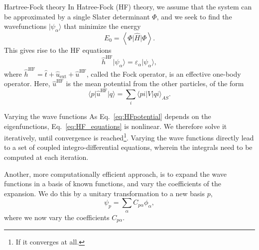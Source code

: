 \documentclass[UKenglish,aspectratio=169]{beamer}
\begin{document}
\begin{frame}{Hartree-Fock theory}
    In Hatree-Fock (HF) theory, we assume that the system can be
    approximated by a single Slater determinant $\Phi$, and we seek
    to find the wavefunctions $\lvert \psi_\alpha \rangle$ that
    minimize the energy
    \begin{equation}
        E_0 = \left\langle \Phi \vert \hat{H} \vert \Phi \right\rangle.
    \end{equation}
    This gives rise to the HF equations
    \begin{equation}\label{eq:HF_equations}
        \hat{h}^\mathrm{HF} \lvert \psi_\alpha \rangle =
        \varepsilon_\alpha \lvert \psi_\alpha \rangle,
    \end{equation}
    where $\hat{h}^\mathrm{HF} = \hat{t} + \hat{u}_{\mathrm{ext}} +
    \hat{u}^\mathrm{HF}$, called the Fock operator, is an effective
    one-body operator.
    Here, $\hat{u}^\mathrm{HF}$ is the mean potential from the other
    particles, of the form
    \begin{equation}\label{eq:HFpotential}
        \langle p \vert \hat{u}^\mathrm{HF} \vert q \rangle =
        \sum_{i} \langle pi \vert V \vert qi \rangle_{AS}.
    \end{equation}
\end{frame}

\begin{frame}{Varying the wave functions}
    As Eq.~\eqref{eq:HFpotential} depends on the eigenfunctions,
    Eq.~\eqref{eq:HF_equations} is nonlinear.
    We therefore solve it iteratively, until convergence is
    reached\footnote{If it converges at all.}.
    Varying the wave functions directly lead to a set of coupled
    integro-differential equations, wherein the integrals need to be
    computed at each iteration.

    \bigskip

    Another, more computationally efficient approach, is to expand
    the wave functions in a basis of known functions, and vary the
    coefficients of the expansion.
    We do this by a unitary transformation to a new basis $p$,
    \begin{equation}
        \psi_p = \sum_{\alpha} C_{p\alpha} \phi_\alpha,
    \end{equation}
    where we now vary the coefficients $C_{p\alpha}$.
\end{frame}
\end{document}

